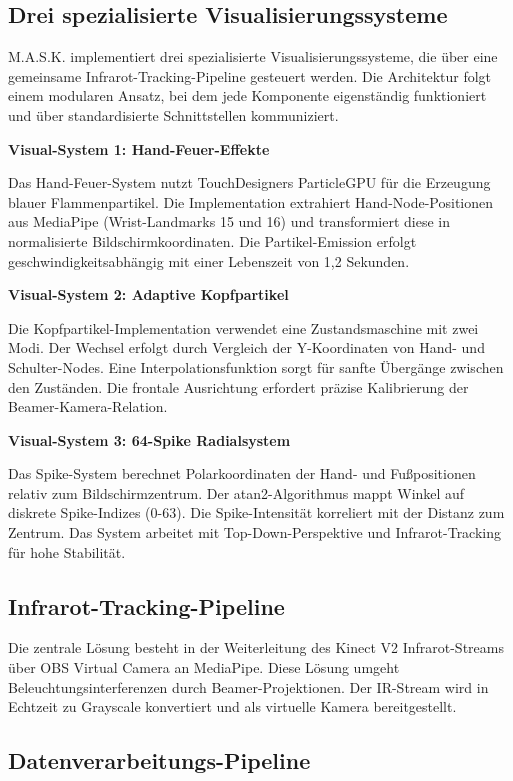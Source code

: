 \subsection{Drei spezialisierte Visualisierungssysteme}

M.A.S.K. implementiert drei spezialisierte Visualisierungssysteme, die über eine gemeinsame Infrarot-Tracking-Pipeline gesteuert werden. Die Architektur folgt einem modularen Ansatz, bei dem jede Komponente eigenständig funktioniert und über standardisierte Schnittstellen kommuniziert.

\textbf{Visual-System 1: Hand-Feuer-Effekte}


Das Hand-Feuer-System nutzt TouchDesigners ParticleGPU für die Erzeugung blauer Flammenpartikel. Die Implementation extrahiert Hand-Node-Positionen aus MediaPipe (Wrist-Landmarks 15 und 16) und transformiert diese in normalisierte Bildschirmkoordinaten. Die Partikel-Emission erfolgt geschwindigkeitsabhängig mit einer Lebenszeit von 1,2 Sekunden.

\textbf{Visual-System 2: Adaptive Kopfpartikel}


Die Kopfpartikel-Implementation verwendet eine Zustandsmaschine mit zwei Modi. Der Wechsel erfolgt durch Vergleich der Y-Koordinaten von Hand- und Schulter-Nodes. Eine Interpolationsfunktion sorgt für sanfte Übergänge zwischen den Zuständen. Die frontale Ausrichtung erfordert präzise Kalibrierung der Beamer-Kamera-Relation.

\textbf{Visual-System 3: 64-Spike Radialsystem}


Das Spike-System berechnet Polarkoordinaten der Hand- und Fußpositionen relativ zum Bildschirmzentrum. Der atan2-Algorithmus mappt Winkel auf diskrete Spike-Indizes (0-63). Die Spike-Intensität korreliert mit der Distanz zum Zentrum. Das System arbeitet mit Top-Down-Perspektive und Infrarot-Tracking für hohe Stabilität.

\clearpage
\subsection{Infrarot-Tracking-Pipeline}


Die zentrale Lösung besteht in der Weiterleitung des Kinect V2 Infrarot-Streams über OBS Virtual Camera an MediaPipe. Diese Lösung umgeht Beleuchtungsinterferenzen durch Beamer-Projektionen. Der IR-Stream wird in Echtzeit zu Grayscale konvertiert und als virtuelle Kamera bereitgestellt.

\subsection*{Datenverarbeitungs-Pipeline}


